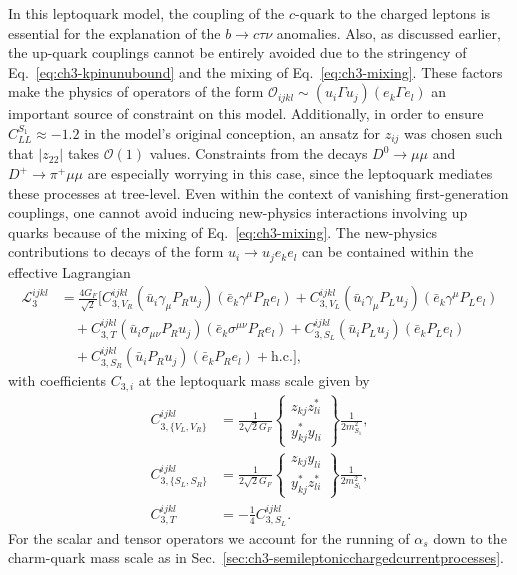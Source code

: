 In this leptoquark model, the coupling of the $c$-quark to the charged leptons
is essential for the explanation of the $b \to c \tau \nu$ anomalies. Also, as
discussed earlier, the up-quark couplings cannot be entirely avoided due to the
stringency of Eq.~\eqref{eq:ch3-kpinunubound} and the mixing of
Eq.~\eqref{eq:ch3-mixing}. These factors make the physics of operators of the form
$\mathscr{O}_{ijkl} \sim (u_i \Gamma u_j) (e_k \Gamma e_l)$ an important
source of constraint on this model. Additionally, in order to ensure
$C_{LL}^{S_{1}} \approx -1.2$ in the model's original conception, an ansatz for
$z_{ij}$ was chosen such that $|z_{22}|$ takes $\mathscr{O}(1)$ values.
Constraints from the decays $D^0 \rightarrow \mu \mu$ and $D^+ \rightarrow \pi^+
\mu \mu$ are especially worrying in this case, since the leptoquark mediates
these processes at tree-level. Even within the context of vanishing
first-generation couplings, one cannot avoid inducing new-physics interactions
involving up quarks because of the mixing of Eq.~\eqref{eq:ch3-mixing}. The
new-physics contributions to decays of the form $u_i \to u_j e_k e_l$ can
be contained within the effective Lagrangian
\begin{equation}
  \begin{split}
    \mathscr{L}_3^{i j k l}
    &= \frac{4 G_F}{\sqrt{2}} \bigg[  C^{ijkl}_{3, V_{R}}  (\bar{u}_i \gamma_\mu P_R u_j)(\bar{e}_k \gamma^\mu P_R e_l) + C_{3, V_{L}}^{ijkl} (\bar{u}_i \gamma_\mu P_L u_j)(\bar{e}_k \gamma^\mu P_L e_l)\\ &\quad + C_{3, T}^{ijkl} (\bar{u}_i \sigma_{\mu\nu} P_R u_j)(\bar{e}_k \sigma^{\mu\nu} P_R e_l) + C_{3, S_L}^{ijkl} (\bar{u}_i P_L u_j)(\bar{e}_k P_L e_l)\\ &\quad + C_{3, S_R}^{ijkl}(\bar{u}_i P_R u_j)(\bar{e}_k P_R e_l) + \text{h.c.}
    \bigg],
  \end{split}
\end{equation}
with coefficients $C_{3,i}$ at the leptoquark mass scale given by
\begin{align}
  C_{3,\{V_L,V_R\}}^{ijkl} &= \frac{1}{2\sqrt{2} G_F} \left\{ \begin{matrix} z_{kj}z_{li}^*\\ y^*_{kj} y_{li} \end{matrix}  \right\} \frac{1}{2 m_{S_{1}}^2},\\
  C_{3,\{S_L,S_R\}}^{ijkl} &= \frac{1}{2\sqrt{2} G_F} \left\{ \begin{matrix} z_{kj}y_{li}\\ y^*_{kj} z^*_{li} \end{matrix}  \right\} \frac{1}{2 m_{S_{1}}^2},\\
  C_{3,T}^{ijkl} &= -\frac{1}{4} C^{ijkl}_{3,S_L}.
\end{align}
For the scalar and tensor operators we account for the running of $\alpha_s$
down to the charm-quark mass scale as in
Sec.~\ref{sec:ch3-semileptonicchargedcurrentprocesses}.

